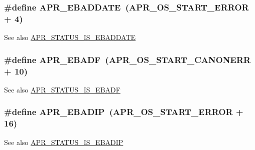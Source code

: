 \subsubsection[{\texorpdfstring{A\+P\+R\+\_\+\+E\+B\+A\+D\+D\+A\+TE}{APR_EBADDATE}}]{\setlength{\rightskip}{0pt plus 5cm}\#define A\+P\+R\+\_\+\+E\+B\+A\+D\+D\+A\+TE~({\bf A\+P\+R\+\_\+\+O\+S\+\_\+\+S\+T\+A\+R\+T\+\_\+\+E\+R\+R\+OR} + 4)}\hypertarget{group___a_p_r___error_ga7911720c540a929cc08a2c25e606b56e}{}\label{group___a_p_r___error_ga7911720c540a929cc08a2c25e606b56e}
\begin{DoxySeeAlso}{See also}
\hyperlink{group___a_p_r___s_t_a_t_u_s___i_s_gab1b413746f4aae5ff891774f4948fcf6}{A\+P\+R\+\_\+\+S\+T\+A\+T\+U\+S\+\_\+\+I\+S\+\_\+\+E\+B\+A\+D\+D\+A\+TE} 
\end{DoxySeeAlso}
\subsubsection[{\texorpdfstring{A\+P\+R\+\_\+\+E\+B\+A\+DF}{APR_EBADF}}]{\setlength{\rightskip}{0pt plus 5cm}\#define A\+P\+R\+\_\+\+E\+B\+A\+DF~({\bf A\+P\+R\+\_\+\+O\+S\+\_\+\+S\+T\+A\+R\+T\+\_\+\+C\+A\+N\+O\+N\+E\+RR} + 10)}\hypertarget{group___a_p_r___error_ga204df8a37a5c7fd6b2c74ea098fbac02}{}\label{group___a_p_r___error_ga204df8a37a5c7fd6b2c74ea098fbac02}
\begin{DoxySeeAlso}{See also}
\hyperlink{group___a_p_r___s_t_a_t_u_s___i_s_ga8ac1ab146cc24d07099515446becfee7}{A\+P\+R\+\_\+\+S\+T\+A\+T\+U\+S\+\_\+\+I\+S\+\_\+\+E\+B\+A\+DF} 
\end{DoxySeeAlso}
\subsubsection[{\texorpdfstring{A\+P\+R\+\_\+\+E\+B\+A\+D\+IP}{APR_EBADIP}}]{\setlength{\rightskip}{0pt plus 5cm}\#define A\+P\+R\+\_\+\+E\+B\+A\+D\+IP~({\bf A\+P\+R\+\_\+\+O\+S\+\_\+\+S\+T\+A\+R\+T\+\_\+\+E\+R\+R\+OR} + 16)}\hypertarget{group___a_p_r___error_ga96180fb8075ae0150bfed50c2e7f7a59}{}\label{group___a_p_r___error_ga96180fb8075ae0150bfed50c2e7f7a59}
\begin{DoxySeeAlso}{See also}
\hyperlink{group___a_p_r___s_t_a_t_u_s___i_s_ga9c1dc9da536956a3f986662e6a69f7a9}{A\+P\+R\+\_\+\+S\+T\+A\+T\+U\+S\+\_\+\+I\+S\+\_\+\+E\+B\+A\+D\+IP} 
\end{DoxySeeAlso}
